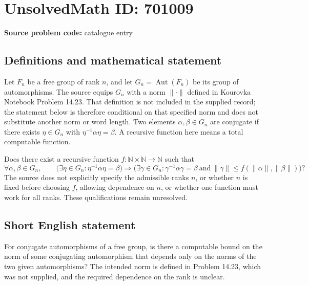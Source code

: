 \documentclass[11pt]{article}
\begin{document}
\section*{UnsolvedMath ID: 701009}
\textbf{Source problem code:} catalogue entry
\subsection{Definitions and mathematical statement}
Let \(F_n\) be a free group of rank \(n\), and let \(G_n=\operatorname{Aut}(F_n)\) be its group of automorphisms. The source equips \(G_n\) with a norm \(\lVert\cdot\rVert\) defined in Kourovka Notebook Problem 14.23. That definition is not included in the supplied record; the statement below is therefore conditional on that specified norm and does not substitute another norm or word length. Two elements \(\alpha,\beta\in G_n\) are conjugate if there exists \(\eta\in G_n\) with \(\eta^{-1}\alpha\eta=\beta\). A recursive function here means a total computable function.

Does there exist a recursive function \(f:\mathbb{N}\times\mathbb{N}\to\mathbb{N}\) such that
\[
\forall\alpha,\beta\in G_n,\qquad
\bigl(\exists\eta\in G_n:\eta^{-1}\alpha\eta=\beta\bigr)
\Longrightarrow
\bigl(\exists\gamma\in G_n:\gamma^{-1}\alpha\gamma=\beta
\ \text{and}\ 
\lVert\gamma\rVert\leq f(\lVert\alpha\rVert,\lVert\beta\rVert)\bigr)?
\]
The source does not explicitly specify the admissible ranks \(n\), or whether \(n\) is fixed before choosing \(f\), allowing dependence on \(n\), or whether one function must work for all ranks. These qualifications remain unresolved.
\subsection{Short English statement}
For conjugate automorphisms of a free group, is there a computable bound on the norm of some conjugating automorphism that depends only on the norms of the two given automorphisms? The intended norm is defined in Problem 14.23, which was not supplied, and the required dependence on the rank is unclear.
\end{document}
